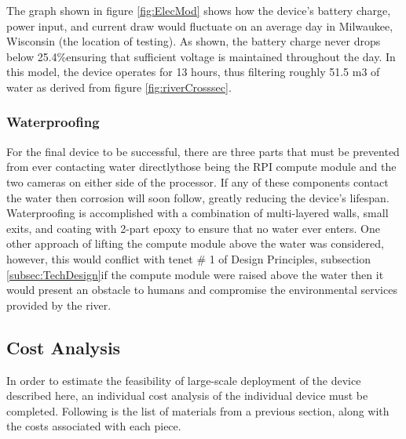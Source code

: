 \documentclass[fleqn,10pt]{SelfArx} %
\begin{document}
	The graph shown in figure \ref{fig:ElecMod} shows how the device’s battery charge, power input, and current draw would fluctuate on an average day in Milwaukee, Wisconsin (the location of testing). As shown, the battery charge never drops below 25.4\%\textemdash ensuring that sufficient voltage is maintained throughout the day. In this model, the device operates for 13 hours, thus filtering roughly 51.5 m3 of water as derived from figure \ref{fig:riverCrosssec}.  
	
	
	\subsubsection{Waterproofing}
	For the final device to be successful, there are three parts that must be prevented from ever contacting water directly\textemdash those being the RPI compute module and the two cameras on either side of the processor. If any of these components contact the water then corrosion will soon follow, greatly reducing the device’s lifespan. Waterproofing is accomplished with a combination of multi-layered walls, small exits, and coating with 2-part epoxy to ensure that no water ever enters. One other approach of lifting the compute module above the water was considered, however, this would conflict with tenet \# 1 of Design Principles, subsection \ref{subsec:TechDesign}\textemdash if the compute module were raised above the water then it would present an obstacle to humans and compromise the environmental services provided by the river. 
	\subsection{Cost Analysis}
	
	In order to estimate the feasibility of large-scale deployment of the device described here, an individual cost analysis of the individual device must be completed. Following is the list of materials from a previous section, along with the costs associated with each piece. 
	
\end{document}
